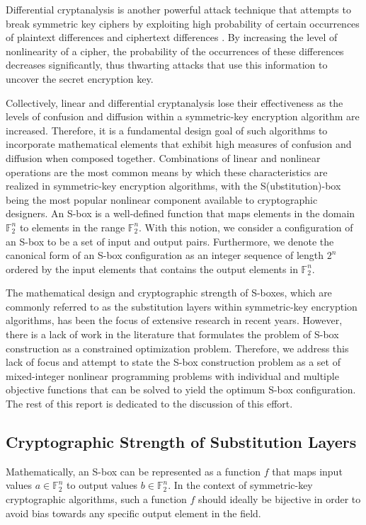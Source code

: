 \documentclass[11pt]{article}
\newcommand{\field}[1]{\mathbb{#1}} %
\begin{document}
Differential cryptanalysis is another powerful attack technique that attempts to break symmetric key ciphers by exploiting high probability of certain occurrences of plaintext differences and ciphertext differences \cite{Heys01atutorial}. By increasing the level of nonlinearity of a cipher, the probability of the occurrences of these differences decreases significantly, thus thwarting attacks that use this information to uncover the secret encryption key. 

Collectively, linear and differential cryptanalysis lose their effectiveness as the levels of confusion and diffusion within a symmetric-key encryption algorithm are increased. Therefore, it is a fundamental design goal of such algorithms to incorporate mathematical elements that exhibit high measures of confusion and diffusion when composed together. Combinations of linear and nonlinear operations are the most common means by which these characteristics are realized in symmetric-key encryption algorithms, with the S(ubstitution)-box being the most popular nonlinear component available to cryptographic designers. An S-box is a well-defined function that maps elements in the domain $\field{F}_2^n$ to elements in the range $\field{F}_2^n$. With this notion, we consider a configuration of an S-box to be a set of input and output pairs. Furthermore, we denote the canonical form of an S-box configuration as an integer sequence of length $2^n$ ordered by the input elements that contains the output elements in $\field{F}_2^n$.

The mathematical design and cryptographic strength of S-boxes, which are commonly referred to as the substitution layers within symmetric-key encryption algorithms, has been the focus of extensive research in recent years. However, there is a lack of work in the literature that formulates the problem of S-box construction as a constrained optimization problem. Therefore, we address this lack of focus and attempt to state the S-box construction problem as a set of mixed-integer nonlinear programming problems with individual and multiple objective functions that can be solved to yield the optimum S-box configuration. The rest of this report is dedicated to the discussion of this effort.

\subsection{Cryptographic Strength of Substitution Layers}
\label{strength}
Mathematically, an S-box can be represented as a function $f$ that maps input values $a \in \field{F}_2^n$ to output values $b \in \field{F}_2^n$. In the context of symmetric-key cryptographic algorithms, such a function $f$ should ideally be bijective in order to avoid bias towards any specific output element in the field. 
\end{document}
